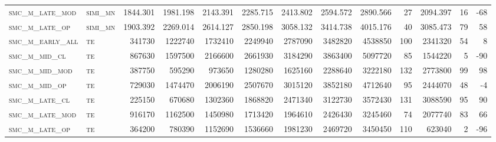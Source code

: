 \begin{landscape}
\begin{center}
\begin{footnotesize}
\begin{longtable}{llrrrrrrrr|rrr}
\textsc{smc\_m\_late\_mod } & \textsc{simi\_mn  }   & 1844.301 & 1981.198 & 2143.391 & 2285.715 & 2413.802 & 2594.572 & 2890.566 & 27     & 2094.397      & 16            & -68             \\
\textsc{smc\_m\_late\_op  } & \textsc{simi\_mn  }   & 1903.392 & 2269.014 & 2614.127 & 2850.198 & 3058.132 & 3414.738 & 4015.176 & 40     & 3085.473      & 79            & 58              \\
\textsc{smc\_m\_early\_all} & \textsc{te  	    }   & 341730   & 1222740  & 1732410  & 2249940  & 2787090  & 3482820  & 4538850  & 100    & 2341320       & 54            & 8               \\
\textsc{smc\_m\_mid\_cl   } & \textsc{te        }   & 867630   & 1597500  & 2166600  & 2661930  & 3184290  & 3863400  & 5097720  & 85     & 1544220       & 5             & -90             \\
\textsc{smc\_m\_mid\_mod  } & \textsc{te        }   & 387750   & 595290   & 973650   & 1280280  & 1625160  & 2288640  & 3222180  & 132    & 2773800       & 99            & 98              \\
\textsc{smc\_m\_mid\_op   } & \textsc{te        }   & 729030   & 1474470  & 2006190  & 2507670  & 3015120  & 3852180  & 4712640  & 95     & 2444070       & 48            & -4              \\
\textsc{smc\_m\_late\_cl  } & \textsc{te        }   & 225150   & 670680   & 1302360  & 1868820  & 2471340  & 3122730  & 3572430  & 131    & 3088590       & 95            & 90              \\
\textsc{smc\_m\_late\_mod } & \textsc{te        }   & 916170   & 1162500  & 1450980  & 1713420  & 1964610  & 2426430  & 3245460  & 74     & 2077740       & 83            & 66              \\
\textsc{smc\_m\_late\_op  } & \textsc{te        }   & 364200   & 780390   & 1152690  & 1536660  & 1981230  & 2469720  & 3450450  & 110    & 623040        & 2             & -96            

\end{longtable}
\end{footnotesize}
\end{center}
\end{landscape}

\restoregeometry
\pagestyle{headings}


